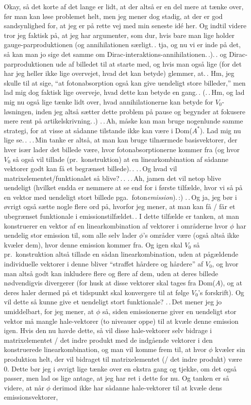\documentclass{report}
\begin{document}
Okay, så det korte af det lange er lidt, at der altså er en del mere at tænke over, før man kan løse problemet helt, men jeg mener dog stadig, at der er god sandsynlighed for, at jeg er på rette vej med min seneste idé her. Og indtil videre tror jeg faktisk på, at jeg har argumenter, som dur, hvis bare man lige holder gauge-parproduktionen (og annihilationen særligt.\,. tja, og nu vi er inde på det, så kan man jo sige det samme om Dirac-interaktions-annihilationen.\,.).\,. og Dirac-parproduktionen ude af billedet til at starte med, og hvis man også lige (for det har jeg heller ikke lige overvejet, hvad det kan betyde) glemmer, at.\,. Hm, jeg skulle til at sige, ``at fotonabsorption også kan give uendeligt store billeder,'' men lad mig dog faktisk lige overveje, hvad dette kan betyde en gang.\,. (.\,.\,Hm, og lad mig nu også lige tænke lidt over, hvad annihilationerne kan betyde for $V_0$-løsningen, inden jeg altså sætter dette problem på pause og begynder at fokusere mere rent på artikelskrivning.\,.) .\,.\,Ah, måske kan man bruge nogenlunde samme strategi, for at visse at sådanne tilstande ikke kan være i Dom($A^*$). Lad mig nu lige se.\,. .\,.\,Min tanke er altså, at man kan bruge tilnærmede basisvektorer, der hver især lader det billede være, hvor fotonabsorptionerne kommer fra (og hvor $V_0$ så også vil tillade (pr.\ konstruktion) at en linearkombination af sådanne vektorer godt kan få et begrænset billede).\,. .\,.\,Og hvad vil matrixelementet/funktionalet så blive?\,.\,. .\,.\,Ah, jamen det vil netop blive uendeligt (hvilket endda er nemmere at se end for i første tilfælde, hvor vi så på en vektor med uendeligt stort billede pga.\ foton\emph{emission}).\,:) .\,.\,Og ja, jeg bør i øvrigt også sætte nogle flere ord på, hvorfor jeg mener, at man kan få / får et ubegrænset funktionale i emissionstilfældet.\,. I dette tilfælde er tanken, at man konstruerer en vektor af en linearkombination af vektorer i områderne hvor $\phi$ har uendelig stor emission til, som alle selv lader $\phi$'s områder være (også altså ikke kvæler dem), hvor denne emission kommer fra. Og igen skal $V_0$ så pr.\ konstruktion altså tillade en sådan linearkombination, uden at pågældende individuelle vektorer i denne bliver ``straffet hårdere og hårdere'' af $V_0$, og hvor man altså godt kan inkludere flere og flere af dem, uden at deres billede nødvendigvis divergerer (for husk at disse vektorer skal tages fra Dom($A$), og at deres haler dermed på et tidspunkt skal konvergere til at følge $V_0$'s forskrift). Og vil dette så kunne give et uendeligt stort funktionale? .\,.\,Det mener jeg jo umiddelbart, for jeg mener, at $\phi$ så, siden emissionerne giver en uendeligt stor vektor må mangle hale-vektorer (to niveauer oppe) til at kvæle denne emission igen. Hvis den nu havde dette, så vil disse hale-vektorer selv bidrage i matrixelementet / det indre produkt med de indgående vektorer i den konstruerede linearkombination, og man vil komme frem til, at hvor $\phi$ kvæler sin produktion helt, der vil bidraget til matrixelementet (/ det indre produkt) være 0. Dette bør jeg i øvrigt lige tænke over en ekstra gang og tjekke, om det også passer, men lad os lige antage, at jeg har ret i dette for nu. Og tanken er så videre, at når $\phi$ derimod ikke har sådanne hale-vektorer til at kvæle dens emissionsvektorer, 
\end{document}
